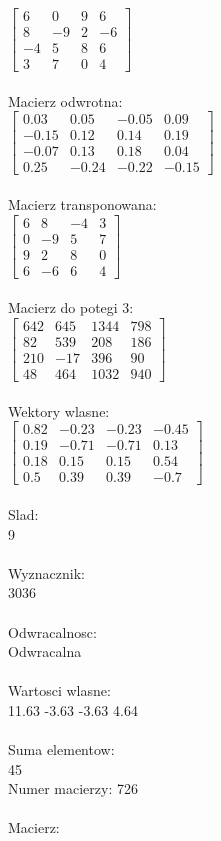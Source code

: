 \documentclass[a4paper,12pt]{article}
\begin{document}
$\begin{bmatrix} 6&0&9&6\\8&-9&2&-6\\-4&5&8&6\\3&7&0&4 \end{bmatrix}$
\\
\\
Macierz odwrotna:\\

$\begin{bmatrix} 0.03&0.05&-0.05&0.09\\-0.15&0.12&0.14&0.19\\-0.07&0.13&0.18&0.04\\0.25&-0.24&-0.22&-0.15 \end{bmatrix}$
\\
\\
Macierz transponowana:\\

$\begin{bmatrix} 6&8&-4&3\\0&-9&5&7\\9&2&8&0\\6&-6&6&4 \end{bmatrix}$
\\
\\
Macierz do potegi 3:\\

$\begin{bmatrix} 642&645&1344&798\\82&539&208&186\\210&-17&396&90\\48&464&1032&940 \end{bmatrix}$
\\
\\
Wektory wlasne:\\

$\begin{bmatrix} 0.82&-0.23&-0.23&-0.45\\0.19&-0.71&-0.71&0.13\\0.18&0.15&0.15&0.54\\0.5&0.39&0.39&-0.7 \end{bmatrix}$
\\
\\
Slad:\\
9
\\
\\
Wyznacznik:\\
3036
\\
\\
Odwracalnosc:\\
Odwracalna
\\
\\
Wartosci wlasne:\\
11.63 -3.63 -3.63 4.64
\\
\\
Suma elementow:\\
45
\\
\newpage
Numer macierzy:
726
\\
\\
Macierz:\\
\end{document}
